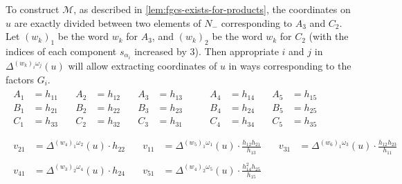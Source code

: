 \documentclass{amsart}
\theoremstyle{plain}
\theoremstyle{definition}
\theoremstyle{remark}
\newcommand{\conftoquiv}{\mathcal{M}}
\newcommand{\fundamentalweight}{\omega}
\newcommand{\genminor}[2]{\Delta^{{#1} \fundamentalweight_{#2}}}
\begin{document}
  To construct $\conftoquiv$, as described in
  \cref{lem:fgcs-exists-for-products}, the coordinates on $u$ are
  exactly divided between two elements of $N_{-}$ corresponding to $A_3$
  and $C_2$. Let $(w_k)_{1}$ be the word $w_k$ for $A_3$, and
  $(w_k)_{2}$ be the word $w_k$ for $C_2$ (with the indices of each
  component $s_{\alpha_i}$ increased by $3$). Then appropriate $i$ and
  $j$ in $\genminor{(w_k)_i}{j}(u)$ will allow extracting coordinates of
  $u$ in ways corresponding to the factors $G_i$.
  \begin{equation*}
    \begin{gathered}
      \begin{aligned}
        A_1 &= h_{11} &\quad A_2 &= h_{12} &\quad A_3 &= h_{13} &\qquad A_4 &= h_{14} &\quad A_5 &= h_{15} \\
        B_1 &= h_{21} &\quad B_2 &= h_{22} &\quad B_3 &= h_{23} &\qquad B_4 &= h_{24} &\quad B_5 &= h_{25} \\
        C_1 &= h_{33} &\quad C_2 &= h_{32} &\quad C_3 &= h_{31} &\qquad C_4 &= h_{34} &\quad C_5 &= h_{35} \\
      \end{aligned}
      \\
      \begin{aligned}
        v_{2 1} &= \genminor{(w_{4})_{1}}{2}(u) \cdot h_{22} & \quad
        v_{1 1} &= \genminor{(w_{5})_{1}}{1}(u) \cdot \frac{h_{12} h_{21} }{h_{13}} & \quad
        v_{3 1} &= \genminor{(w_{6})_{1}}{3}(u) \cdot \frac{h_{12} h_{23} }{h_{11}}
      \end{aligned}
      \\
      \begin{aligned}
        v_{4 1} &= \genminor{(w_{3})_{2}}{4}(u) \cdot h_{24} &\quad v_{5 1} &= \genminor{(w_{4})_{2}}{5}(u) \cdot \frac{h_{14}^2 h_{25} }{h_{15}}
      \end{aligned}
    \end{gathered}
  \end{equation*}

  \printbibliography %
\end{document}
